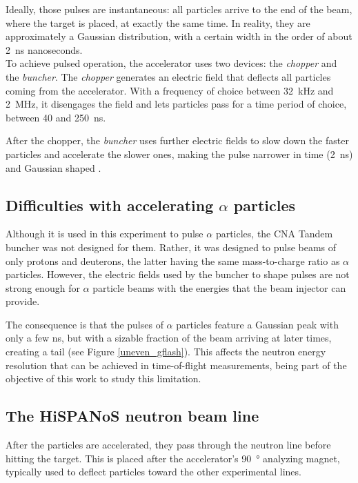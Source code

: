 \documentclass[a4paper,12pt]{report}
\begin{document}
Ideally, those pulses are instantaneous: all particles arrive to the end of the beam, where the target is placed, at exactly the same time.
In reality, they are approximately a Gaussian distribution, with a certain width in the order of about \qty{2}{\nano\second} nanoseconds.
\\

To achieve pulsed operation, the accelerator uses two devices: the \textit{chopper} and the \textit{buncher}.
The \textit{chopper} generates an electric field that deflects all particles coming from the accelerator.
With a frequency of choice between \qty{32}{\kilo\Hz} and \qty{2}{\mega\Hz}, it disengages the field and lets particles pass for a time period of choice, between 40 and \qty{250}{\nano\second}.

After the chopper, the \textit{buncher} uses further electric fields to slow down the faster particles and accelerate the slower ones, making the pulse narrower in time (\qty{2}{\nano\second}) and Gaussian shaped \cite{hispanos}.
\\

\subsection{Difficulties with accelerating $\alpha$ particles}
Although it is used in this experiment to pulse $\alpha$ particles, the CNA Tandem buncher was not designed for them.
Rather, it was designed to pulse beams of only protons and deuterons, the latter having the same mass-to-charge ratio as $\alpha$ particles.
However, the electric fields used by the buncher to shape pulses are not strong enough for $\alpha$ particle beams with the energies that the beam injector can provide.

The consequence is that the pulses of $\alpha$ particles feature a Gaussian peak with only a few \unit{\nano\second}, but with a sizable fraction of the beam arriving at later times, creating a tail (see Figure \ref{uneven_gflash}).
This affects the neutron energy resolution that can be achieved in time-of-flight measurements, being part of the objective of this work to study this limitation.
\\

\subsection{The HiSPANoS neutron beam line}
After the particles are accelerated, they pass through the neutron line before hitting the target.
This is placed after the accelerator's \qty{90}{\degree} analyzing magnet, typically used to deflect particles toward the other experimental lines.
\end{document}
